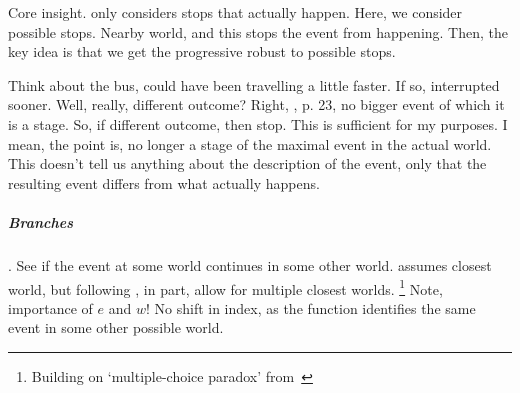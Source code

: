 \begin{note}
  Core insight.
  \citeauthor{Landman:1992wh} only considers stops that actually happen.
  Here, we consider possible stops.
  Nearby world, and this stops the event from happening.
  Then, the key idea is that we get the progressive robust to possible stops.
  \begin{algorithm}[H]
    \SetAlgoLined
    \DontPrintSemicolon
    \caption{\AlgGetPStops{}\label{PrAl:g-s}}
  \end{algorithm}
  Think about the bus, could have been travelling a little faster.
  If so, interrupted sooner.
  Well, really, different outcome?
  Right, \citeauthor{Landman:1992wh}, p. 23, no bigger event of which it is a stage.
  So, if different outcome, then stop.
  This is sufficient for my purposes.
  I mean, the point is, no longer a stage of the maximal event in the actual world.
  This doesn't tell us anything about the description of the event, only that the resulting event differs from what actually happens.
\end{note}

\subparagraph{Branches}

\begin{note}
  \AlgFindBranches{}.
  See if the event at some world continues in some other world.
  \citeauthor{Landman:1992wh} assumes closest world, but following \textcite[37]{Szabo:2004ul}, in part, allow for multiple closest worlds.%
  \footnote{
    Building on `multiple-choice paradox' from~\textcite{Bonomi:1997uq}
  }
  Note, importance of \(e\) and \(w\)!
  No shift in index, as the function identifies the same event in some other possible world.

    \begin{algorithm}[H]
    \SetAlgoLined
    \DontPrintSemicolon
    \caption{\AlgFindBranches{}\label{PrAl:find-branches}}
  \end{algorithm}
\end{note}

